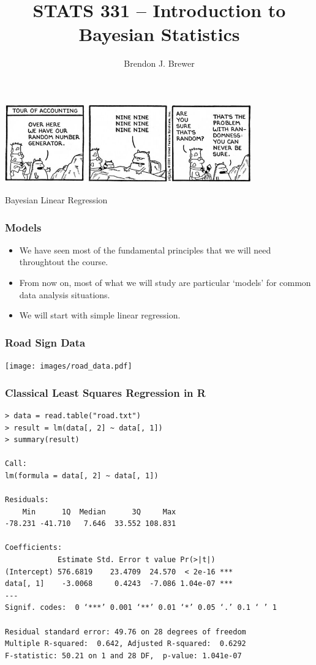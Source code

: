 \documentclass{beamer}
\author{Brendon J. Brewer}
\title{STATS 331 -- Introduction to Bayesian Statistics}
\institute{The University of Auckland}
\date{}
\begin{document}
\frame{\titlepage}

\begin{frame}
\centering
\includegraphics[width=0.8\textwidth]{images/dilbert.jpg}

\end{frame}



\begin{frame}
\centering
\large
Bayesian Linear Regression

\end{frame}


\begin{frame}
\frametitle{Models}
\begin{itemize}
\item We have seen most of the fundamental principles that we will need
throughtout the course.\pause
\item From now on, most of what we will study are particular `models'
for common data analysis situations.\pause
\item We will start with simple linear regression.
\end{itemize}

\end{frame}



\begin{frame}
\frametitle{Road Sign Data}
\centering
\texttt{[image: images/road\_data.pdf]}
\end{frame}


\begin{frame}[fragile]
\frametitle{Classical Least Squares Regression in R}
\tiny
\begin{verbatim}
> data = read.table("road.txt")
> result = lm(data[, 2] ~ data[, 1])
> summary(result)

Call:
lm(formula = data[, 2] ~ data[, 1])

Residuals:
    Min      1Q  Median      3Q     Max 
-78.231 -41.710   7.646  33.552 108.831 

Coefficients:
            Estimate Std. Error t value Pr(>|t|)    
(Intercept) 576.6819    23.4709  24.570  < 2e-16 ***
data[, 1]    -3.0068     0.4243  -7.086 1.04e-07 ***
---
Signif. codes:  0 ‘***’ 0.001 ‘**’ 0.01 ‘*’ 0.05 ‘.’ 0.1 ‘ ’ 1

Residual standard error: 49.76 on 28 degrees of freedom
Multiple R-squared:  0.642,	Adjusted R-squared:  0.6292 
F-statistic: 50.21 on 1 and 28 DF,  p-value: 1.041e-07
\end{verbatim}

\end{frame}
\end{document}
